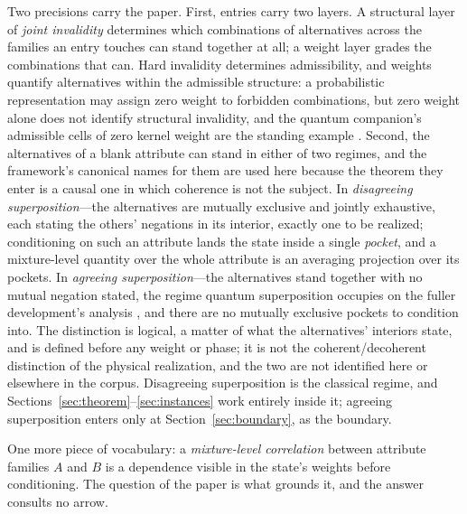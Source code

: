 \documentclass[11pt]{article}
\begin{document}
Two precisions carry the paper. First, entries carry two layers. A structural layer of \emph{joint invalidity} determines which combinations of alternatives across the families an entry touches can stand together at all; a weight layer grades the combinations that can. Hard invalidity determines admissibility, and weights quantify alternatives within the admissible structure: a probabilistic representation may assign zero weight to forbidden combinations, but zero weight alone does not identify structural invalidity, and the quantum companion's admissible cells of zero kernel weight are the standing example \cite{AethusQuant}. Second, the alternatives of a blank attribute can stand in either of two regimes, and the framework's canonical names for them are used here because the theorem they enter is a causal one in which coherence is not the subject. In \emph{disagreeing superposition}---the alternatives are mutually exclusive and jointly exhaustive, each stating the others' negations in its interior, exactly one to be realized; conditioning on such an attribute lands the state inside a single \emph{pocket}, and a mixture-level quantity over the whole attribute is an averaging projection over its pockets. In \emph{agreeing superposition}---the alternatives stand together with no mutual negation stated, the regime quantum superposition occupies on the fuller development's analysis \cite{Aethus}, and there are no mutually exclusive pockets to condition into. The distinction is logical, a matter of what the alternatives' interiors state, and is defined before any weight or phase; it is not the coherent/decoherent distinction of the physical realization, and the two are not identified here or elsewhere in the corpus. Disagreeing superposition is the classical regime, and Sections~\ref{sec:theorem}--\ref{sec:instances} work entirely inside it; agreeing superposition enters only at Section~\ref{sec:boundary}, as the boundary.

One more piece of vocabulary: a \emph{mixture-level correlation} between attribute families $A$ and $B$ is a dependence visible in the state's weights before conditioning. The question of the paper is what grounds it, and the answer consults no arrow.
\end{document}

